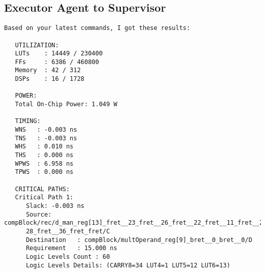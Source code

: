 \subsection{Executor Agent to Supervisor}
\vspace{-0.5em}
\begin{reviewerbox}
\begin{lstlisting}
Based on your latest commands, I got these results:

   UTILIZATION:
   LUTs    : 14449 / 230400
   FFs     : 6386 / 460800
   Memory  : 42 / 312
   DSPs    : 16 / 1728

   POWER:
   Total On-Chip Power: 1.049 W

   TIMING:
   WNS   : -0.003 ns
   TNS   : -0.003 ns
   WHS   : 0.010 ns
   THS   : 0.000 ns
   WPWS  : 6.958 ns
   TPWS  : 0.000 ns

   CRITICAL PATHS:
   Critical Path 1:
      Slack: -0.003 ns
      Source: compBlock/rec/d_man_reg[13]_fret__23_fret__26_fret__22_fret__11_fret__20_fret__
      28_fret__36_fret_fret/C
      Destination   : compBlock/multOperand_reg[9]_bret__0_bret__0/D
      Requirement   : 15.000 ns
      Logic Levels Count : 60
      Logic Levels Details: (CARRY8=34 LUT4=1 LUT5=12 LUT6=13)
\end{lstlisting}
\end{reviewerbox}


